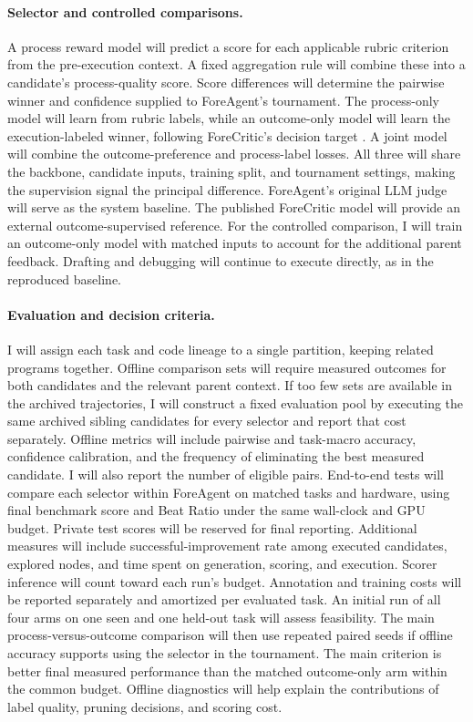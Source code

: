 \paragraph{Selector and controlled comparisons.}
A process reward model will predict a score for each applicable rubric criterion from the pre-execution context. A fixed aggregation rule will combine these into a candidate's process-quality score. Score differences will determine the pairwise winner and confidence supplied to ForeAgent's tournament. The process-only model will learn from rubric labels, while an outcome-only model will learn the execution-labeled winner, following ForeCritic's decision target \citep{lee2026forecritic}. A joint model will combine the outcome-preference and process-label losses. All three will share the backbone, candidate inputs, training split, and tournament settings, making the supervision signal the principal difference. ForeAgent's original LLM judge will serve as the system baseline. The published ForeCritic model will provide an external outcome-supervised reference. For the controlled comparison, I will train an outcome-only model with matched inputs to account for the additional parent feedback. Drafting and debugging will continue to execute directly, as in the reproduced baseline.

\paragraph{Evaluation and decision criteria.}
I will assign each task and code lineage to a single partition, keeping related programs together. Offline comparison sets will require measured outcomes for both candidates and the relevant parent context. If too few sets are available in the archived trajectories, I will construct a fixed evaluation pool by executing the same archived sibling candidates for every selector and report that cost separately. Offline metrics will include pairwise and task-macro accuracy, confidence calibration, and the frequency of eliminating the best measured candidate. I will also report the number of eligible pairs. End-to-end tests will compare each selector within ForeAgent on matched tasks and hardware, using final benchmark score and Beat Ratio under the same wall-clock and GPU budget. Private test scores will be reserved for final reporting. Additional measures will include successful-improvement rate among executed candidates, explored nodes, and time spent on generation, scoring, and execution. Scorer inference will count toward each run's budget. Annotation and training costs will be reported separately and amortized per evaluated task. An initial run of all four arms on one seen and one held-out task will assess feasibility. The main process-versus-outcome comparison will then use repeated paired seeds if offline accuracy supports using the selector in the tournament. The main criterion is better final measured performance than the matched outcome-only arm within the common budget. Offline diagnostics will help explain the contributions of label quality, pruning decisions, and scoring cost.
